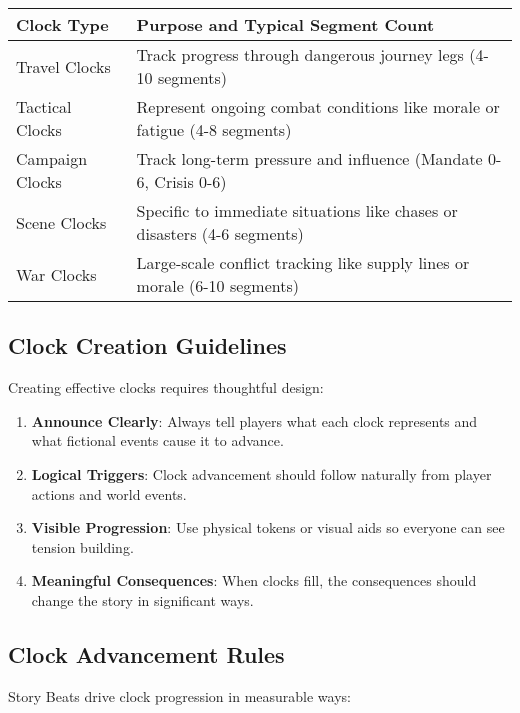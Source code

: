 \begin{fatebox}
\begin{tabularx}{\textwidth}{lX}
\toprule
\textbf{Clock Type} & \textbf{Purpose and Typical Segment Count} \\
\midrule
Travel Clocks & Track progress through dangerous journey legs (4-10 segments) \\
Tactical Clocks & Represent ongoing combat conditions like morale or fatigue (4-8 segments) \\
Campaign Clocks & Track long-term pressure and influence (Mandate 0-6, Crisis 0-6) \\
Scene Clocks & Specific to immediate situations like chases or disasters (4-6 segments) \\
War Clocks & Large-scale conflict tracking like supply lines or morale (6-10 segments) \\
\bottomrule
\end{tabularx}
\end{fatebox}

\subsection*{Clock Creation Guidelines}

Creating effective clocks requires thoughtful design:

\begin{enumerate}
    \item \textbf{Announce Clearly}: Always tell players what each clock represents and what fictional events cause it to advance.
    \item \textbf{Logical Triggers}: Clock advancement should follow naturally from player actions and world events.
    \item \textbf{Visible Progression}: Use physical tokens or visual aids so everyone can see tension building.
    \item \textbf{Meaningful Consequences}: When clocks fill, the consequences should change the story in significant ways.
\end{enumerate}

\subsection*{Clock Advancement Rules}

Story Beats drive clock progression in measurable ways:

